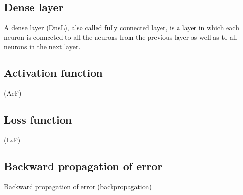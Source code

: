 \subsection{Dense layer}\label{denseLayers}
A dense layer (DnsL), also called fully connected layer, is a layer in which each neuron is connected to all the neurons from the previous layer as well as to all neurons in the next layer.
\subsection{Activation function}\label{activationFunction}
(AcF)
\subsection{Loss function}\label{lossFunction}
(LsF)
\subsection{Backward propagation of error}\label{backpropagation}
Backward propagation of error  (backpropagation)
